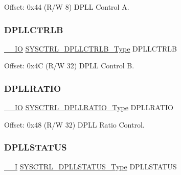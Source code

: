 Offset\+: 0x44 (R/W 8) D\+P\+LL Control A. 

\mbox{\label{struct_sysctrl_a218349cb36190230b3285bf64b5f31e7}} 
\subsubsection{\texorpdfstring{DPLLCTRLB}{DPLLCTRLB}}
{\footnotesize\ttfamily \mbox{\hyperlink{core__cm0plus_8h_aec43007d9998a0a0e01faede4133d6be}{\+\_\+\+\_\+\+IO}} \mbox{\hyperlink{union_s_y_s_c_t_r_l___d_p_l_l_c_t_r_l_b___type}{S\+Y\+S\+C\+T\+R\+L\+\_\+\+D\+P\+L\+L\+C\+T\+R\+L\+B\+\_\+\+Type}} D\+P\+L\+L\+C\+T\+R\+LB}



Offset\+: 0x4C (R/W 32) D\+P\+LL Control B. 

\mbox{\label{struct_sysctrl_a70ffba38ed4ce7b15fed4772764567b8}} 
\subsubsection{\texorpdfstring{DPLLRATIO}{DPLLRATIO}}
{\footnotesize\ttfamily \mbox{\hyperlink{core__cm0plus_8h_aec43007d9998a0a0e01faede4133d6be}{\+\_\+\+\_\+\+IO}} \mbox{\hyperlink{union_s_y_s_c_t_r_l___d_p_l_l_r_a_t_i_o___type}{S\+Y\+S\+C\+T\+R\+L\+\_\+\+D\+P\+L\+L\+R\+A\+T\+I\+O\+\_\+\+Type}} D\+P\+L\+L\+R\+A\+T\+IO}



Offset\+: 0x48 (R/W 32) D\+P\+LL Ratio Control. 

\mbox{\label{struct_sysctrl_a8e23ba910f1392daf817d67a3d15829d}} 
\subsubsection{\texorpdfstring{DPLLSTATUS}{DPLLSTATUS}}
{\footnotesize\ttfamily \mbox{\hyperlink{core__cm0plus_8h_af63697ed9952cc71e1225efe205f6cd3}{\+\_\+\+\_\+I}} \mbox{\hyperlink{union_s_y_s_c_t_r_l___d_p_l_l_s_t_a_t_u_s___type}{S\+Y\+S\+C\+T\+R\+L\+\_\+\+D\+P\+L\+L\+S\+T\+A\+T\+U\+S\+\_\+\+Type}} D\+P\+L\+L\+S\+T\+A\+T\+US}



